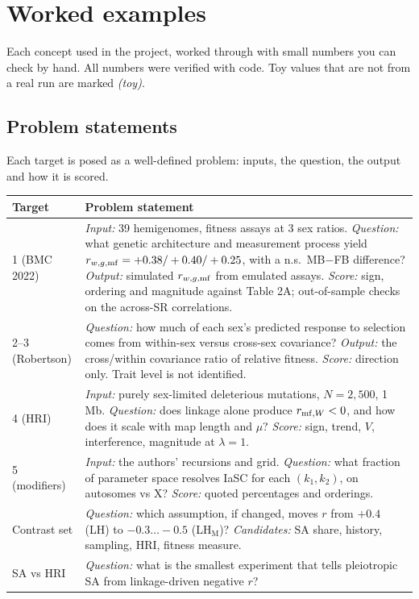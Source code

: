 \chapter{Worked examples}\label{ch:examples}
Each concept used in the project, worked through with small numbers you can check by hand. All numbers were verified with code. Toy values that are not from a real run are marked \emph{(toy)}.

\section{Problem statements}
Each target is posed as a well-defined problem: inputs, the question, the output and how it is scored.

\begin{longtable}{p{2.6cm}p{12.6cm}}\toprule
\textbf{Target} & \textbf{Problem statement}\\\midrule\endhead
1 (BMC 2022) & \emph{Input:} 39 hemigenomes, fitness assays at 3 sex ratios. \emph{Question:} what genetic architecture and measurement process yield $r_{w,g,\mathrm{mf}}=+0.38/+0.40/+0.25$, with a n.s.\ MB$-$FB difference? \emph{Output:} simulated $r_{w,g,\mathrm{mf}}$ from emulated assays. \emph{Score:} sign, ordering and magnitude against Table 2A; out-of-sample checks on the across-SR correlations.\\
2--3 (Robertson) & \emph{Question:} how much of each sex's predicted response to selection comes from within-sex versus cross-sex covariance? \emph{Output:} the cross/within covariance ratio of relative fitness. \emph{Score:} direction only. Trait level is not identified.\\
4 (HRI) & \emph{Input:} purely sex-limited deleterious mutations, $N=2{,}500$, 1\,Mb. \emph{Question:} does linkage alone produce $r_{\mathrm{mf},W}<0$, and how does it scale with map length and $\mu$? \emph{Score:} sign, trend, $V$, interference, magnitude at $\lambda=1$.\\
5 (modifiers) & \emph{Input:} the authors' recursions and grid. \emph{Question:} what fraction of parameter space resolves IaSC for each $(k_1,k_2)$, on autosomes vs X? \emph{Score:} quoted percentages and orderings.\\
Contrast set & \emph{Question:} which assumption, if changed, moves $r$ from $+0.4$ (LH) to $-0.3\ldots-0.5$ (LH$_\mathrm{M}$)? \emph{Candidates:} SA share, history, sampling, HRI, fitness measure.\\
SA vs HRI & \emph{Question:} what is the smallest experiment that tells pleiotropic SA from linkage-driven negative $r$?\\\bottomrule
\end{longtable}

